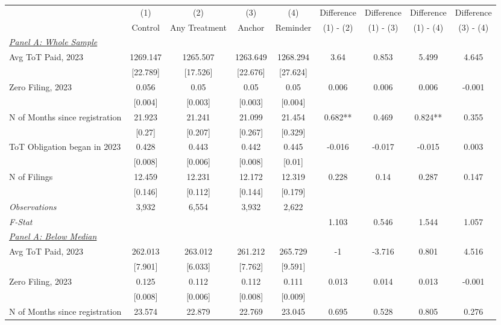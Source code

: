 \begin{tabular}{lcccccccc}
\tabularnewline \midrule \midrule
& (1) & (2) & (3) & (4) & Difference & Difference & Difference & Difference\\
& Control & Any Treatment & Anchor & Reminder & (1) - (2) & (1) - (3) & (1) - (4) & (3) - (4) \\ 

\midrule
\multicolumn{1}{l}{\underline{\textit{Panel A: Whole Sample}}} & & & & & & & & \\ 
 \addlinespace 
Avg ToT Paid, 2023 & 1269.147 & 1265.507 & 1263.649 & 1268.294 & 3.64 & 0.853 & 5.499 & 4.645\\
 & {}[22.789] & {}[17.526] & {}[22.676] & {}[27.624] &  &  &  & \\
Zero Filing, 2023 & 0.056 & 0.05 & 0.05 & 0.05 & 0.006 & 0.006 & 0.006 & -0.001\\
 & {}[0.004] & {}[0.003] & {}[0.003] & {}[0.004] &  &  &  & \\
N of Months since registration & 21.923 & 21.241 & 21.099 & 21.454 & 0.682** & 0.469 & 0.824** & 0.355\\
 & {}[0.27] & {}[0.207] & {}[0.267] & {}[0.329] &  &  &  & \\
ToT Obligation began in 2023 & 0.428 & 0.443 & 0.442 & 0.445 & -0.016 & -0.017 & -0.015 & 0.003\\
 & {}[0.008] & {}[0.006] & {}[0.008] & {}[0.01] &  &  &  & \\
N of Filings & 12.459 & 12.231 & 12.172 & 12.319 & 0.228 & 0.14 & 0.287 & 0.147\\
 & {}[0.146] & {}[0.112] & {}[0.144] & {}[0.179] &  &  &  & \\
\midrule
\textit{Observations} & 3,932 & 6,554 & 3,932 & 2,622 &  &  &  & \\
\textit{F-Stat} &  &  &  &  & 1.103 & 0.546 & 1.544 & 1.057\\
\midrule
\multicolumn{1}{l}{\underline{\textit{Panel A: Below Median}}} & & & & & & & & \\ 
 \addlinespace 
Avg ToT Paid, 2023 & 262.013 & 263.012 & 261.212 & 265.729 & -1 & -3.716 & 0.801 & 4.516\\
 & {}[7.901] & {}[6.033] & {}[7.762] & {}[9.591] &  &  &  & \\
Zero Filing, 2023 & 0.125 & 0.112 & 0.112 & 0.111 & 0.013 & 0.014 & 0.013 & -0.001\\
 & {}[0.008] & {}[0.006] & {}[0.008] & {}[0.009] &  &  &  & \\
N of Months since registration & 23.574 & 22.879 & 22.769 & 23.045 & 0.695 & 0.528 & 0.805 & 0.276\\

\end{tabular}
